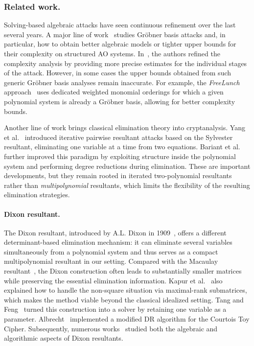 \subsubsection{Related work.}
Solving-based algebraic attacks have seen continuous refinement over the last several years. A major line of work~\cite{DBLP:journals/iacr/SauerS21,DBLP:phd/hal/Bouvier23,DBLP:conf/crypto/BariantBLAOPR24,DBLP:journals/tosc/Steiner24,DBLP:journals/tosc/KoschatkoLR24,DBLP:conf/asiacrypt/LiuMM24,DBLP:journals/tosc/GrassiKR25,DBLP:journals/iacr/BakBBBOP25} studies Gr\"obner basis attacks and, in particular, how to obtain better algebraic models or tighter upper bounds for their complexity on structured AO systems. In~\cite{DBLP:journals/tosc/KoschatkoLR24}, the authors refined the complexity analysis by providing more precise estimates for the individual stages of the attack. However, in some cases the upper bounds obtained from such generic Gr\"obner basis analyses remain inaccurate. For example, the \emph{FreeLunch} approach~\cite{DBLP:conf/crypto/BariantBLAOPR24} uses dedicated weighted monomial orderings for which a given polynomial system is already a Gr\"obner basis, allowing for better complexity bounds.

Another line of work brings classical elimination theory into cryptanalysis. Yang et al.~\cite{DBLP:conf/asiacrypt/YangZYLT24} introduced iterative pairwise resultant attacks based on the Sylvester resultant, eliminating one variable at a time from two equations. Bariant et al.~\cite{DBLP:conf/crypto/BariantBBHOR25} further improved this paradigm by exploiting structure inside the polynomial system and performing degree reductions during elimination. These are important developments, but they remain rooted in iterated two-polynomial resultants rather than \emph{multipolynomial} resultants, which limits the flexibility of the resulting elimination strategies.

\paragraph{Dixon resultant.}
The Dixon resultant, introduced by A.L. Dixon in 1909~\cite{Dixon1909}, offers a different determinant-based elimination mechanism: it can eliminate several variables simultaneously from a polynomial system and thus serves as a compact multipolynomial resultant in our setting. Compared with the Macaulay resultant~\cite{macaulay1902some}, the Dixon construction often leads to substantially smaller matrices while preserving the essential elimination information. Kapur et al.~\cite{DBLP:conf/issac/KapurSY94} also explained how to handle the non-square situation via maximal-rank submatrices, which makes the method viable beyond the classical idealized setting.
Tang and Feng~\cite{cryptoeprint:2005/312} turned this construction into a solver by retaining one variable as a parameter.
Albrecht~\cite{Albrecht2008} implemented a modified DR algorithm for the Courtois Toy Cipher.
Subsequently, numerous works~\cite{Lewis2017,Zhao2005extfast,DengQiTangDuan2022,DBLP:journals/jsc/QinZYC22,DBLP:journals/ijcm/QinWTJ17,DBLP:conf/casc/JinaduM22,JinaduMonagan2025} studied both the algebraic and algorithmic aspects of Dixon resultants.

